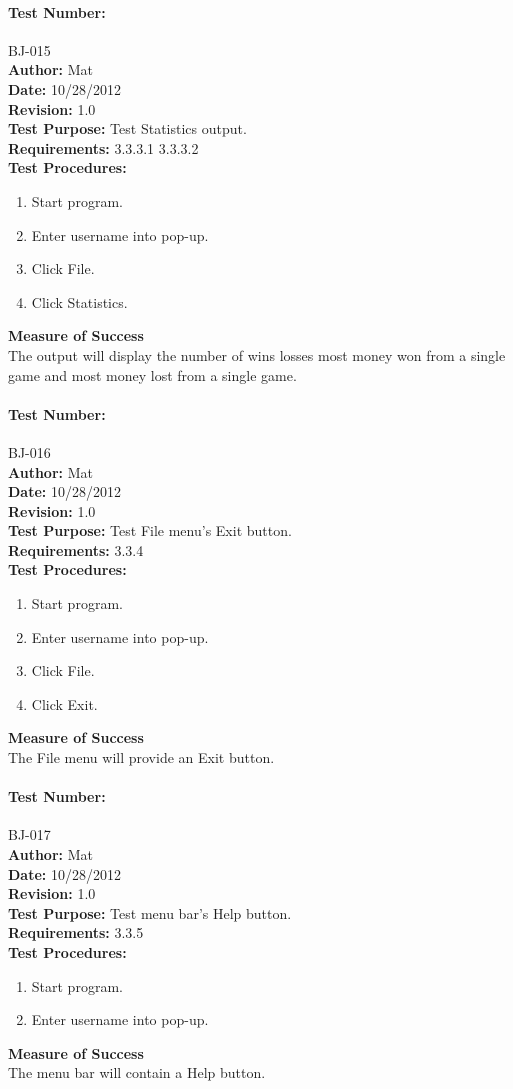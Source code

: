 \documentclass{article}
\begin{document}
\paragraph{Test Number:} BJ-015\\
\textbf{Author:} Mat\\
\textbf{Date:} 10/28/2012\\
\textbf{Revision:} 1.0\\
\textbf{Test Purpose:} Test Statistics output.\\
\textbf{Requirements:} 3.3.3.1 3.3.3.2 \\
\textbf{Test Procedures:} 
\begin{enumerate}
\item Start program.
\item Enter username into pop-up.
\item Click File.
\item Click Statistics.
\end{enumerate}
\textbf{Measure of Success}\\The output will display the number of wins losses most money won from a single game and most money lost from a single game.
\paragraph{Test Number:} BJ-016\\
\textbf{Author:} Mat\\
\textbf{Date:} 10/28/2012\\
\textbf{Revision:} 1.0\\
\textbf{Test Purpose:} Test File menu's Exit button.\\
\textbf{Requirements:} 3.3.4 \\
\textbf{Test Procedures:} 
\begin{enumerate}
\item Start program.
\item Enter username into pop-up.
\item Click File.
\item Click Exit.
\end{enumerate}
\textbf{Measure of Success}\\The File menu will provide an Exit button.
\paragraph{Test Number:} BJ-017\\
\textbf{Author:} Mat\\
\textbf{Date:} 10/28/2012\\
\textbf{Revision:} 1.0\\
\textbf{Test Purpose:} Test menu bar's Help button.\\
\textbf{Requirements:} 3.3.5 \\
\textbf{Test Procedures:} 
\begin{enumerate}
\item Start program.
\item Enter username into pop-up.
\end{enumerate}
\textbf{Measure of Success}\\The menu bar will contain a Help button.
\end{document}
